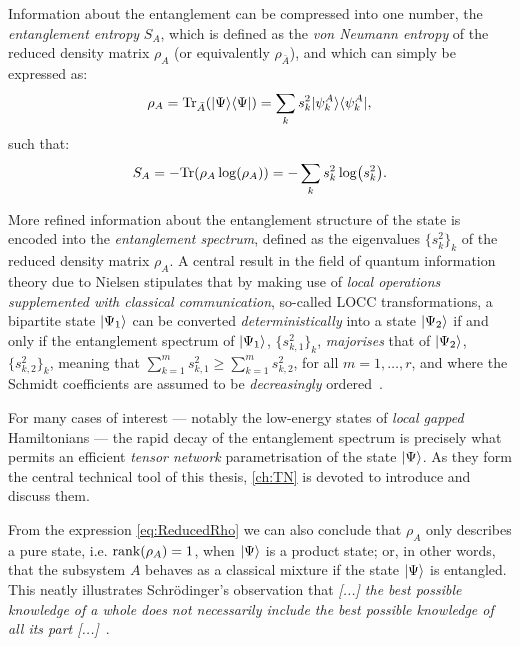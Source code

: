 Information about the entanglement can be compressed into one number, the \emph{entanglement entropy} $S_A$, which is defined as the \emph{von Neumann entropy} of the reduced density matrix $\rho_A$ (or equivalently $\rho_{\bar A}$), and which can simply be expressed as:
\begin{equation}\label{eq:ReducedRho}
	\rho_A = {\rm Tr}_{\bar A}(| \Psi \rangle\langle \Psi |) = \sum_k s_k^2 | \psi_k^A \rangle\langle \psi_k^A |,
\end{equation}
such that:
\begin{equation}
	S_A = -{\rm Tr}(\rho_A\log(\rho_A)) = -\sum_k s_k^2 \log(s_k^2).
\end{equation}

More refined information about the entanglement structure of the state is encoded into the \emph{entanglement spectrum}, defined as the eigenvalues $\{s_k^2\}_k$ of the reduced density matrix $\rho_A$. A central result in the field of quantum information theory due to Nielsen stipulates that by making use of \emph{local operations supplemented with classical communication}, so-called LOCC transformations, a bipartite state $|\Psi_1\rangle$ can be converted \emph{deterministically} into a state $|\Psi_2\rangle$ if and only if the entanglement spectrum of $|\Psi_1\rangle$, $\{s_{k,1}^2\}_k$, \emph{majorises} that of $|\Psi_2\rangle$, $\{s_{k,2}^2\}_k$, meaning that $\sum_{k=1}^m s_{k,1}^2 \geq \sum_{k=1}^m s_{k,2}^2$, for all $m=1,\dots, r$, and where the Schmidt coefficients are assumed to be \emph{decreasingly} ordered~\cite{Nielsen1999}.

For many cases of interest --- notably the low-energy states of \emph{local gapped} Hamiltonians --- the rapid decay of the entanglement spectrum is precisely what permits an efficient \emph{tensor network} parametrisation of the state $| \Psi \rangle$. As they form the central technical tool of this thesis, \cref{ch:TN} is devoted to introduce and discuss them.

From the expression \cref{eq:ReducedRho} we can also conclude that $\rho_A$ only describes a pure state, i.e. $\rank(\rho_A)=1$, when $| \Psi \rangle$ is a product state; or, in other words, that the subsystem $A$ behaves as a classical mixture if the state $| \Psi \rangle$ is entangled. This neatly illustrates Schr\"odinger's observation that \emph{[...] the best possible knowledge of a whole does not necessarily include the best possible knowledge of all its part [...]}~\cite{Schrodinger2008}.

